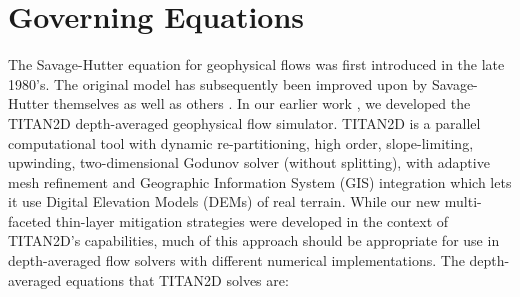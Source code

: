 \documentclass[review]{elsarticle}
\begin{document}
\section{Governing Equations } \label{Method}
The Savage-Hutter equation for geophysical flows was first introduced in the late 1980's. 
The original model has subsequently been 
improved upon by Savage-Hutter themselves as well as others  \cite{Hutter1993,Iverson1997,Gray1999,Denlinger2001,PudasainiHutter2003,SavageIverson2003}.
In our earlier work \cite{Pitman2003,Patra2005,Patra2006}, we developed the TITAN2D depth-averaged geophysical 
flow simulator.  TITAN2D is a parallel computational tool with dynamic re-partitioning, high order, slope-limiting, upwinding, 
two-dimensional Godunov solver (without splitting), with adaptive mesh refinement and Geographic Information System 
(GIS) integration which lets it use Digital Elevation Models (DEMs) of real terrain.  
While our new multi-faceted thin-layer mitigation strategies were developed in the context of TITAN2D's capabilities, 
much of this approach should be appropriate for use in depth-averaged flow solvers with different numerical implementations. 
The depth-averaged equations that TITAN2D solves are:
\end{document}
